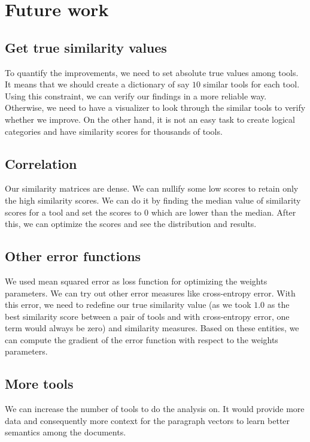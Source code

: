\chapter{Future work}

\section{Get true similarity values}
To quantify the improvements, we need to set absolute true values among tools. It means that we should create a dictionary of say $10$ similar tools for each tool. Using this constraint, we can verify our findings in a more reliable way. Otherwise, we need to have a visualizer to look through the similar tools to verify whether we improve. On the other hand, it is not an easy task to create logical categories and have similarity scores for thousands of tools.

\section{Correlation}
Our similarity matrices are dense. We can nullify some low scores to retain only the high similarity scores. We can do it by finding the median value of similarity scores for a tool and set the scores to $0$ which are lower than the median. After this, we can optimize the scores and see the distribution and results.

\section{Other error functions}
We used mean squared error as loss function for optimizing the weights parameters. We can try out other error measures like cross-entropy error. With this error, we need to redefine our true similarity value (as we took $1.0$ as the best similarity score between a pair of tools and with cross-entropy error, one term would always be zero) and similarity measures. Based on these entities, we can compute the gradient of the error function with respect to the weights parameters. 

\section{More tools}
We can increase the number of tools to do the analysis on. It would provide more data and consequently more context for the paragraph vectors to learn better semantics among the documents. 

